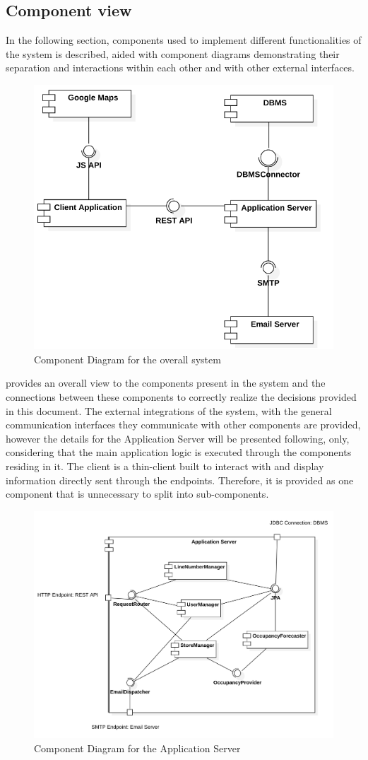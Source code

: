 \subsection{Component view}
In the following section, components used to implement different functionalities of the system is described, aided with component diagrams demonstrating their separation and interactions within each other and with other external interfaces.
\begin{figure}[H]
    \centering
    \includegraphics[height=0.4\textwidth]{Images/ComponentDiagrams/Overall.png}
    \caption{Component Diagram for the overall system}
    \label{fig:CDOverall}
\end{figure}
 provides an overall view to the components present in the system and the connections between these components to correctly realize the decisions provided in this document.
The external integrations of the system, with the general communication interfaces they communicate with other components are provided, however the details for the Application Server will be presented following, only, considering that the main application logic is executed through the components residing in it.
The client is a thin-client built to interact with and display information directly sent through the endpoints.
Therefore, it is provided as one component that is unnecessary to split into sub-components.
\begin{figure}[H]
    \centering
    \includegraphics[height=0.4\textwidth]{Images/ComponentDiagrams/ApplicationServer.png}
    \caption{Component Diagram for the Application Server}
    \label{fig:CDApplicationServer}
\end{figure}
